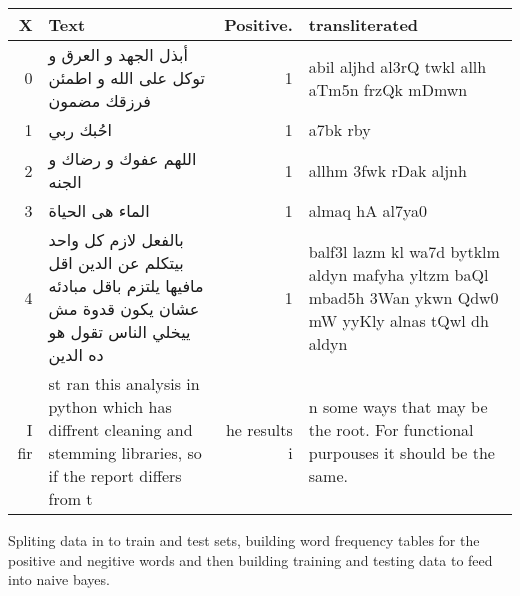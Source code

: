 \documentclass[]{article}
\begin{document}
\begin{longtable}[]{@{}rlrl@{}}
\toprule
X & Text & Positive. & transliterated\tabularnewline
\midrule
\endhead
0 & أبذل الجهد و العرق و توكل على الله و اطمئن فرزقك مضمون & 1 & abil
aljhd al3rQ twkl allh aTm5n frzQk mDmwn\tabularnewline
1 & احُبك ربي & 1 & a7bk rby\tabularnewline
2 & اللهم عفوك و رضاك و الجنه & 1 & allhm 3fwk rDak aljnh\tabularnewline
3 & الماء هى الحياة & 1 & almaq hA al7ya0\tabularnewline
4 & بالفعل لازم كل واحد بيتكلم عن الدين اقل مافيها يلتزم باقل مبادئه
عشان يكون قدوة مش ييخلي الناس تقول هو ده الدين & 1 & balf3l lazm kl wa7d
bytklm aldyn mafyha yltzm baQl mbad5h 3Wan ykwn Qdw0 mW yyKly alnas tQwl
dh aldyn\tabularnewline
I fir & st ran this analysis in python which has diffrent cleaning and
stemming libraries, so if the report differs from t & he results i & n
some ways that may be the root. For functional purpouses it should be
the same.\tabularnewline
\bottomrule
\end{longtable}

Spliting data in to train and test sets, building word frequency tables
for the positive and negitive words and then building training and
testing data to feed into naive bayes.
\end{document}

